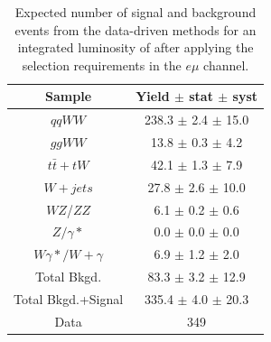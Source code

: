 \begin{table}[ht!]
  \begin{center}
  \begin{tabular} {|c|c|}
\hline
Sample                & Yield $\pm$ stat $\pm$ syst \\ \hline \hline
$qqWW$                & 238.3 $\pm$  2.4 $\pm$ 15.0  \\ \hline
$ggWW$                & 13.8 $\pm$  0.3 $\pm$  4.2  \\ \hline
$t\bar{t} + tW$      & 42.1 $\pm$  1.3 $\pm$  7.9  \\ \hline
$W+jets$              & 27.8 $\pm$  2.6 $\pm$ 10.0  \\ \hline
$WZ$/$ZZ$             &  6.1 $\pm$  0.2 $\pm$  0.6  \\ \hline
$Z/\gamma*$          &  0.0 $\pm$  0.0 $\pm$  0.0  \\ \hline
$W\gamma*/W+\gamma$ &  6.9 $\pm$  1.2 $\pm$  2.0  \\ \hline \hline
Total Bkgd.           & 83.3 $\pm$  3.2 $\pm$ 12.9  \\ \hline \hline
Total Bkgd.+Signal    & 335.4 $\pm$  4.0 $\pm$ 20.3  \\ \hline \hline
Data                  & 349 \\ \hline
\end{tabular}
  \caption{Expected number of signal and background events from the data-driven methods for
  an integrated luminosity of \intlumi after applying the selection requirements in the $e \mu$ channel.}
   \label{tab:data_yields_em}
  \end{center}
\end{table}

